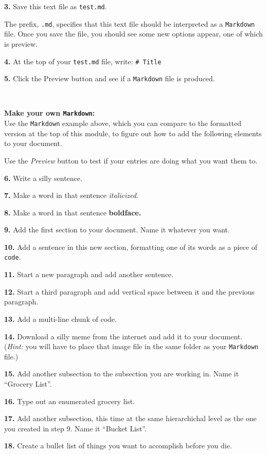 \documentclass[]{book}
\begin{document}
\textbf{3.} Save this text file as \texttt{test.md}.

The prefix, \texttt{.md}, specifies that this text file should be interpreted as a \texttt{Markdown} file. Once you save the file, you should see some new options appear, one of which is preview.

\textbf{4.} At the top of your \texttt{test.md} file, write: \texttt{\#\ Title}

\textbf{5.} Click the Preview button and see if a \texttt{Markdown} file is produced.

~

\textbf{Make your own \texttt{Markdown}:}\\
Use the \texttt{Markdown} example above, which you can compare to the formatted version at the top of this module, to figure out how to add the following elements to your document.

Use the \emph{Preview} button to test if your entries are doing what you want them to.

\textbf{6.} Write a silly sentence.

\textbf{7.} Make a word in that sentence \emph{italicized}.

\textbf{8.} Make a word in that sentence \textbf{boldface.}

\textbf{9.} Add the first section to your document. Name it whatever you want.

\textbf{10.} Add a sentence in this new section, formatting one of its words as a piece of \texttt{code}.

\textbf{11.} Start a new paragraph and add another sentence.

\textbf{12.} Start a third paragraph and add vertical space between it and the previous paragraph.

\textbf{13.} Add a multi-line chunk of code.

\textbf{14.} Download a silly meme from the internet and add it to your document. (\emph{Hint:} you will have to place that image file in the same folder as your \texttt{Markdown} file.)

\textbf{15.} Add another subsection to the subsection you are working in. Name it ``Grocery List''.

\textbf{16.} Type out an enumerated grocery list.

\textbf{17.} Add another subsection, this time at the same hierarchichal level as the one you created in step 9. Name it ``Bucket List''.

\textbf{18.} Create a bullet list of things you want to accomplish before you die.
\end{document}
